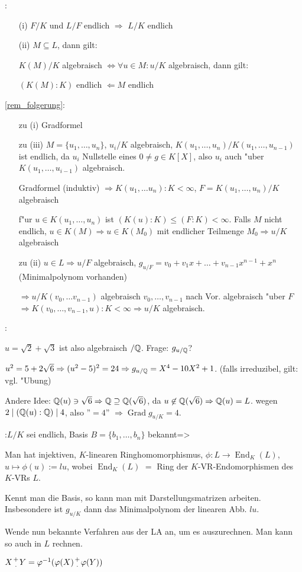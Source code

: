 :{\label{rem_folgerung} 
 \begin{enumerate}
 \item[(i)] $F/K$ und $L/F$ endlich $\Rightarrow$ $L/K$ endlich
 \item[(ii)] $M\subseteq L$, dann gilt:
 
 $K(M)/K$ algebraisch $\iff \forall u\in M: u/K$ algebraisch, dann gilt:
 
 $(K(M):K)$ endlich $\Leftarrow M$ endlich
 \end{enumerate}
}
\proof \ref{rem_folgerung}:{\begin{enumerate}
 \item[zu (i)] Gradformel
 \item[zu (iii)] $M=\{u_1,\ldots, u_n\}$, $u_i/K$ algebraisch,
 $K(u_1,\ldots, u_n)/K(u_1,\ldots,u_{n-1})$ ist endlich, da 
 $u_i$ Nullstelle eines $0\neq g\in K[X]$, also $u_i$ auch "uber
 $K(u_1, \ldots, u_{i-1})$ algebraisch.
 
 Gradformel (induktiv) $\Rightarrow K(u_1, \ldots u_n):K<\infty$,
 $F=K(u_1,\ldots,u_n)/K$ algebraisch
 
 f"ur $u\in K(u_1,\ldots, u_n)$ ist $(K(u):K)\leq(F:K)<\infty$.
 Falls $M$ nicht endlich, $u\in K(M)\Rightarrow u\in K(M_0)$ mit endlicher Teilmenge
 $M_0 \Rightarrow u/K$ algebraisch
 \item[zu (ii)] $u\in L\Rightarrow u/F$ algebraisch, 
 $g_{u/F}=v_0+v_1x+\ldots+v_{n-1}x^{n-1}+x^{n}$ (Minimalpolynom vorhanden)
 
 $\Rightarrow u/K(v_0, \ldots v_{n-1})$ algebraisch 
 $v_0, \ldots, v_{n-1}$ nach Vor. algebraisch "uber $F$
 $\Rightarrow K(v_0, \ldots, v_{n-1},u):K<\infty \Rightarrow u/K$ algebraisch.
 \end{enumerate}
 }
:{$u=\sqrt{2}+\sqrt{3}$ ist also algebraisch $/\mathbb Q$.
Frage: $g_{u/\mathbb Q}$?

$u^2=5+2\sqrt{6}\Rightarrow (u^2-5)^2=24 \Rightarrow g_{u/\mathbb Q}=X^4-10X^2+1$.
(falls irreduzibel, gilt: vgl. "Ubung)

Andere Idee: $\mathbb Q(u)\ni \sqrt{6}\Rightarrow \mathbb Q\supseteq \mathbb Q(\sqrt{6})$, 
da $u \not\in \mathbb Q(\sqrt{6})\Rightarrow \mathbb Q(u)=L$. 
wegen $2\mid (\mathbb Q(u):\mathbb Q)\mid 4$, also ''$=4$'' 
$\Rightarrow \operatorname{Grad}g_{u/K}=4$.
}
:{$L/K$ sei endlich, Basis $B=\{b_1,\ldots, b_n\}$
bekannt}=>{Man hat injektiven, $K$-linearen Ringhomomorphismus, $\phi:L\longrightarrow \operatorname{End}_K(L)$,
$u\mapsto \phi(u):=lu$, wobei $\operatorname{End}_K(L)$
$=$ Ring der $K$-VR-Endomorphismen des $K$-VRs $L$.

Kennt man die Basis, so kann man mit Darstellungsmatrizen arbeiten. Insbesondere ist $g_{u/K}$
dann das Minimalpolynom der linearen Abb. $lu$.

Wende nun bekannte Verfahren aus der LA an, um es auszurechnen. Man kann so auch in $L$ rechnen.

$X\stack(+;\cdot)Y=\phi^{-1}(\phi(X)\stack(+;\cdot)\phi(Y))$
}
